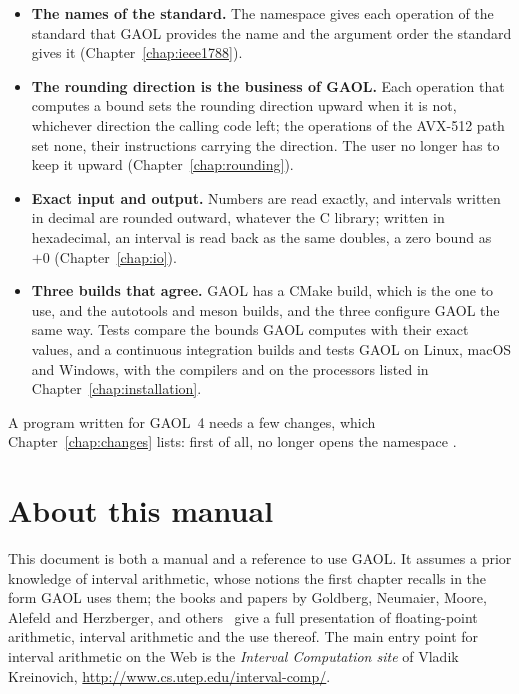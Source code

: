 \begin{itemize}
  power and of  (, , ,
  ),  for a non-positive exponent and
  ; , which GAOL declared, is implemented.
\item[$\bullet$] \textbf{The names of the standard.} The namespace
   gives each operation of the standard that GAOL
  provides the name and the argument order the standard gives it
  (Chapter~\ref{chap:ieee1788}).
\item[$\bullet$] \textbf{The rounding direction is the business of GAOL.}
  Each operation that computes a bound sets the rounding direction upward
  when it is not, whichever direction the calling code left; the
  operations of the AVX-512 path set none, their instructions carrying the
  direction. The user no longer has to keep it upward
  (Chapter~\ref{chap:rounding}).
\item[$\bullet$] \textbf{Exact input and output.} Numbers are read exactly,
  and intervals written in decimal are rounded outward, whatever the C
  library; written in hexadecimal, an interval is read back as the same
  doubles, a zero bound as $+0$ (Chapter~\ref{chap:io}).
\item[$\bullet$] \textbf{Three builds that agree.} GAOL has a CMake build,
  which is the one to use, and the autotools and meson builds, and the three
  configure GAOL the same way. Tests compare the bounds GAOL computes with
  their exact values, and a continuous integration builds and tests GAOL on
  Linux, macOS and Windows, with the compilers and on the processors listed in
  Chapter~\ref{chap:installation}.
\end{itemize}

\noindent
A program written for GAOL~4 needs a few changes, which
Chapter~\ref{chap:changes} lists: first of all,  no longer
opens the namespace .

\section*{About this manual}

This document is both a manual and a reference to use GAOL. It assumes a
prior knowledge of interval arithmetic, whose notions the first chapter
recalls in the form GAOL uses them; the books and papers by Goldberg,
Neumaier, Moore, Alefeld and Herzberger, and
others~\cite{Goldberg:01,IEEE754:2008,Moore:Book1966,Alefeld-Herzberger:83,Neumaier:Book1990}
give a full presentation of floating-point arithmetic, interval arithmetic
and the use thereof.
%
The main entry point for interval arithmetic on the Web is the \emph{Interval
Computation site} of Vladik Kreino\-vich,
\url{http://www.cs.utep.edu/interval-comp/}.

